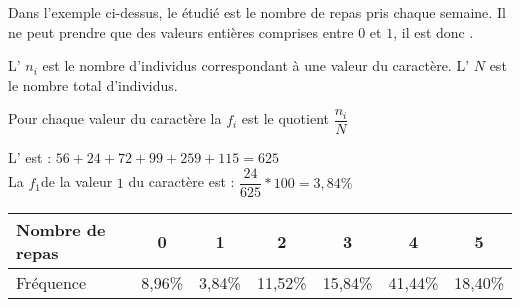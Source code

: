 \documentclass[12pt,a4paper]{article}
\begin{document}
\begin{myex}
	
	Dans l'exemple ci-dessus, le  étudié est le nombre de repas pris chaque semaine. Il ne peut prendre que des valeurs entières comprises entre $0$ et $1$, il est donc .
	
	
\end{myex}

\begin{mydefs}
	L' $n_i$ est le nombre d'individus correspondant à une valeur du caractère. L' $N$ est le nombre total d'individus.
	
	Pour chaque valeur du caractère la  $f_i$ est le quotient $\dfrac{n_i}{N}$
\end{mydefs}		


\begin{myex}
	L' est : $56 + 24 + 72 + 99 + 259 + 115 = 625$\\
	
	La  $f_1$de la valeur $1$ du caractère est : $\dfrac{24}{625} * 100 = 3,84\%$ 

	\begin{center}
		
	
	\begin{tabular}{|@{\ }l@{\ }|@{\ }c@{\ }|@{\ }c@{\ }|@{\ }c@{\ }|@{\ }c@{\ }|@{\ }c@{\ }|@{\ }c@{\ }|}
		\hline
		Nombre de repas & 0 & 1 & 2 & 3 & 4 & 5 \\ \hline
		Fréquence & 8,96\% & 3,84\% & 11,52\% & 15,84\% & 41,44\% & 18,40\% \\ \hline
	\end{tabular}
	\end{center}
\end{myex}
\end{document}
